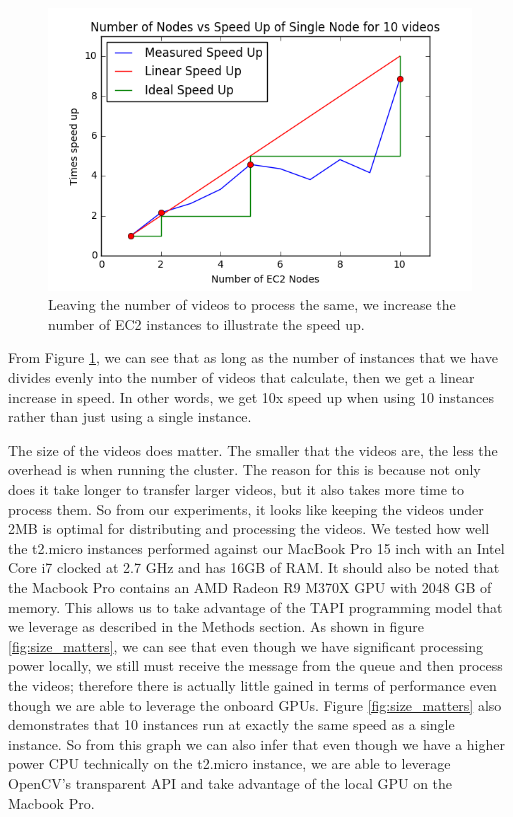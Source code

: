 \begin{figure}[h]
  \label{fig:speed_up}
  \centering
  \includegraphics[width=\columnwidth]{figures/speed_up}
  \caption{Leaving the number of videos to process the same, we increase the
  number of EC2 instances to illustrate the speed up.}
\end{figure}

From Figure \ref{fig:speed_up}, we can see that as long as the number of instances
that we have divides evenly into the number of videos that calculate, then we
get a linear increase in speed. In other words, we get 10x speed up when using
10 instances rather than just using a single instance.

The size of the videos does matter. The smaller that the videos are, the less
the overhead is when running the cluster. The reason for this is because not only
does it take longer to transfer larger videos, but it also takes more time to process
them. So from our experiments, it looks like keeping the videos under 2MB is optimal
for distributing and processing the videos.
We tested how well the t2.micro instances performed against our MacBook Pro 15 inch
with an Intel Core i7 clocked at 2.7 GHz and has 16GB of RAM. It should also be
noted that the Macbook Pro contains an AMD Radeon R9 M370X GPU with 2048 GB of
memory. This allows us to take advantage of the TAPI programming model that
we leverage as described in the Methods section.  As shown in figure \ref{fig:size_matters},
we can see that even though we have significant processing power locally, we still
must receive the message from the queue and then process the videos; therefore
there is actually little gained in terms of performance even though we are able
to leverage the onboard GPUs. Figure \ref{fig:size_matters} also demonstrates
that 10 instances run at exactly the same speed as a single instance. So from this
graph we can also infer that even though we have a higher power CPU technically
on the t2.micro instance, we are able to leverage OpenCV's transparent API and
take advantage of the local GPU on the Macbook Pro.


